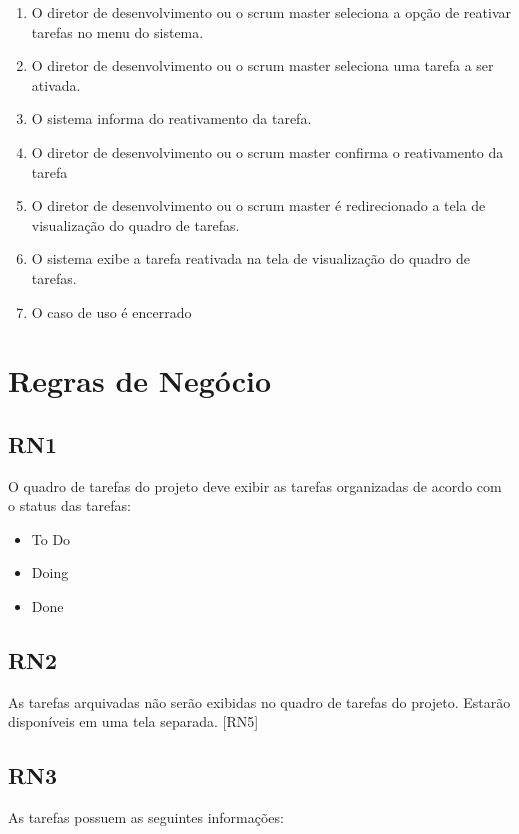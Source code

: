 \begin{enumerate}
  \item O diretor de desenvolvimento ou o scrum master seleciona a opção de reativar tarefas no menu do sistema.
  \item O diretor de desenvolvimento ou o scrum master seleciona uma tarefa a ser ativada.
  \item O sistema informa do reativamento da tarefa.
  \item O diretor de desenvolvimento ou o scrum master confirma o reativamento da tarefa
  \item O diretor de desenvolvimento ou o scrum master é redirecionado a tela de visualização do quadro de tarefas.
  \item O sistema exibe a tarefa reativada na tela de visualização do quadro de tarefas.
  \item O caso de uso é encerrado
\end{enumerate}


\section{Regras de Negócio}

\subsection{RN1}

O quadro de tarefas do projeto deve exibir as tarefas organizadas de acordo com o status das tarefas:
\begin{itemize}
  \item To Do
  \item Doing
  \item Done
\end{itemize}

\subsection{RN2}

As tarefas arquivadas não serão exibidas no quadro de tarefas do projeto. Estarão disponíveis em uma tela separada. [RN5]

\subsection{RN3}

As tarefas possuem as seguintes informações:

